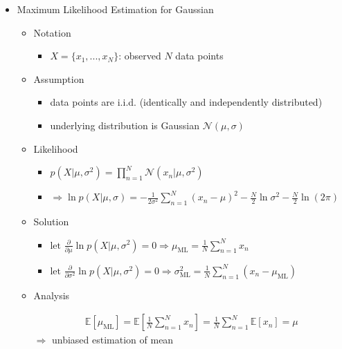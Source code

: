 \begin{itemize}
\item Maximum Likelihood Estimation for Gaussian
	\begin{itemize}
	\item Notation
		\begin{itemize}
		\item $X=\{x_1,...,x_N\}$: observed $N$ data points
		\end{itemize}
	\item Assumption
		\begin{itemize}
		\item data points are i.i.d. (identically and independently distributed)
		\item underlying distribution is Gaussian $\mathcal N(\mu, \sigma)$
		\end{itemize}
	\item Likelihood
		\begin{itemize}
		\item $\displaystyle p(X|\mu,\sigma^2) = \prod_{n=1}^N \mathcal N(x_n|\mu,\sigma^2)$
		\item $\displaystyle \Rightarrow \ln p(X|\mu,\sigma) = -\frac 1{2\sigma^2} \sum_{n=1}^N(x_n-\mu)^2 -\frac N2 \ln \sigma^2 -\frac N2 \ln (2\pi)$
		\end{itemize}
	\item Solution
		\begin{itemize}
		\item $\displaystyle \text{let } \frac {\partial}{\partial \mu} \ln p(X|\mu,\sigma^2) = 0 \Rightarrow \mu_{\text{ML}}=\frac 1N \sum_{n=1}^Nx_n $
		\item $\displaystyle \text{let } \frac {\partial}{\partial \sigma^2} \ln p(X|\mu,\sigma^2)=0 \Rightarrow \sigma_\text{ML}^2 = \frac 1N \sum_{n=1}^N (x_n- \mu_\text{ML})$
		\end{itemize}
	\item Analysis
		\begin{itemize}
		\Item \begin{align*} \displaystyle \mathbb E[\mu_\text{ML}] = \mathbb E[\frac 1N \sum_{n=1}^Nx_n] = \frac 1N \sum_{n=1}^N \mathbb E[x_n] = \mu \tag{as \(x_1,...,x_N\) i.i.d, drawn from \(\mathcal N(\mu,\sigma^2)\), thus \(\sim \mathcal N(\mu,\sigma^2)\)} \end{align*}
		$\Rightarrow$ unbiased estimation of mean
		

\end{itemize}
\end{itemize}
\end{itemize}
